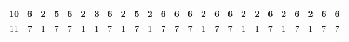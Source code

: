 \begin{sidewaystable}[]
\begin{tabular}{|c|c|c|c|c|c|c|c|c|c|c|c|c|c|c|c|c|c|c|c|c|c|c|c|c|}
    10      & 6                                               & 2                                               & 5                                               & 6                                               & 2                                               & 3                                               & 6                                               & 2                                               & 5                                               & 2                                                & 6                                                & 6                                                & 6                                               & 2                                               & 6                                               & 6                                               & 2                                               & 2                                               & 6                                               & 2                                                 & 6                                               & 2                                                & 6                                                & 6                                                \\ \hline
    11      & 7                                               & 1                                               & 7                                               & 7                                               & 1                                               & 1                                               & 7                                               & 1                                               & 7                                               & 1                                                & 7                                                & 7                                                & 7                                               & 1                                               & 7                                               & 7                                               & 1                                               & 1                                               & 7                                               & 1                                                 & 7                                               & 1                                                & 7                                                & 7                                                \\ \hline

\end{tabular}
\end{sidewaystable}
